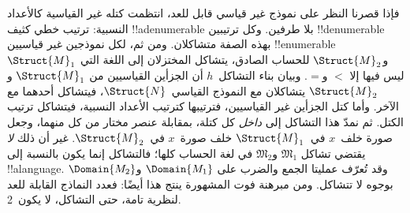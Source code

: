 \documentclass[../../../include/open-logic-section]{subfiles}
\begin{document}
\begin{explain}
فإذا قصرنا النظر على نموذج غير قياسي قابل للعد، انتظمت
كتله غير القياسية كالأعداد النسبية: ترتيب خطي كثيف
!!a{denumerable} بلا طرفين. وكل ترتيبين !!{denumerable}
بهذه الصفة متشاكلان. ومن ثم، لكل نموذجين غير قياسيين
!!{enumerable}~$\Struct{M}_1$ و$\Struct{M}_2$ للحساب الصادق،
يتشاكل المختزلان إلى اللغة التي ليس فيها إلا $<$ و$=$.
وبيان بناء التشاكل~$h$ أن الجزأين القياسيين من $\Struct{M}_1$
و$\Struct{M}_2$ يتشاكلان مع النموذج القياسي~$\Struct{N}$،
فيتشاكل أحدهما مع الآخر. وأما كتل الجزأين غير القياسيين،
فترتيبها كترتيب الأعداد النسبية، فيتشاكل ترتيب الكتل.
ثم نمدّ هذا التشاكل إلى \emph{داخل} كل كتلة، بمقابلة
عنصر مختار من كل منهما، وجعل صورة خلف~$x$
في~$\Struct{M}_1$ خلف صورة~$x$ في~$\Struct{M}_2$.
غير أن ذلك \emph{لا} يقتضي تشاكل $\mathfrak{M}_1$
و$\mathfrak{M}_2$ في لغة الحساب كلها؛ فالتشاكل إنما يكون
بالنسبة إلى !!a{language}. وقد تُعرّف عمليتا الجمع والضرب
على $\Domain{M_1}$ و$\Domain{M_2}$ بوجوه لا تتشاكل.
ومن مبرهنة فوت المشهورة ينتج هذا أيضًا: فعدد النماذج
القابلة للعد لنظرية تامة، حتى التشاكل، لا يكون~2.
\end{explain}
\end{document}
